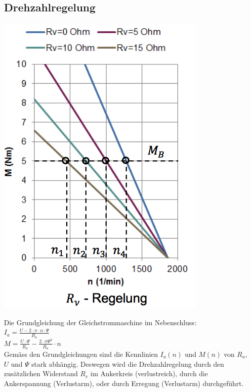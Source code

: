 \subsection{Drehzahlregelung}
\begin{minipage}{0.3 \linewidth}
\includegraphics[width = \linewidth]{./Pics/VL45/Drehzahlregelung}
\end{minipage}
\begin{minipage}{0.7 \linewidth}
Die Grundgleichung der Gleichstrommaschine im Nebenschluss: \\

$I_a = \frac{U- 2\cdot\pi \cdot n \cdot \Psi}{R_a}$\\

$M = \frac{U \cdot \Psi}{R_a}- \frac{2\cdot\pi\Psi^2}{R_a}\cdot n$\\

Gemäss den Grundgleichungen sind die Kennlinien $I_a(n)$ und $M(n)$ von $R_a$, $U$ und $\Psi$ stark abhängig. Deswegen wird die Drehzahlregelung durch den zusätzlichen Widerstand $R_v$ im Ankerkreis (verlustreich), durch die Ankerspannung (Verlustarm), oder durch Erregung (Verlustarm) durchgeführt.
\end{minipage}

